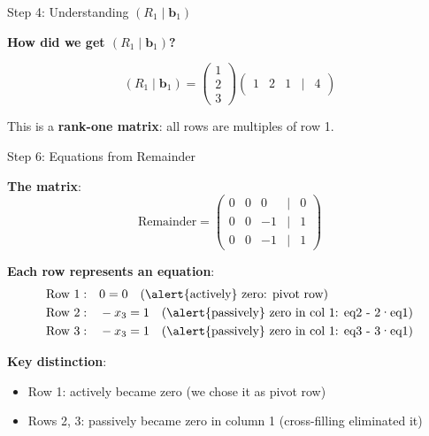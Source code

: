 \documentclass[10pt]{beamer}
\theoremstyle{definition}
\newcommand{\x}[1]{\alert{\textbf{#1}}}
\begin{document}
\begin{frame}{Step 4: Understanding $(R_1 \mid \mathbf{b}_1)$}

\x{How did we get $(R_1 \mid \mathbf{b}_1)$?}

$$(R_1 \mid \mathbf{b}_1) = \begin{pmatrix} 1 \\ 2 \\ 3 \end{pmatrix} \begin{pmatrix} 1 & 2 & 1 & | & 4 \end{pmatrix}$$

\vspace{1em}

This is a \x{rank-one matrix}: all rows are multiples of row 1.

\end{frame}

\begin{frame}{Step 6: Equations from Remainder}

\x{The matrix}:
$$\text{Remainder} = \begin{pmatrix}
0 & 0 & 0 & | & 0 \\
0 & 0 & -1 & | & 1 \\
0 & 0 & -1 & | & 1
\end{pmatrix}$$

\vspace{0.5em}

\x{Each row represents an equation}:
\begin{align*}
\text{Row 1}: &\quad 0 = 0 \quad \text{(\alert{actively} zero: pivot row)} \\
\text{Row 2}: &\quad -x_3 = 1 \quad \text{(\alert{passively} zero in col 1: eq2 - 2·eq1)} \\
\text{Row 3}: &\quad -x_3 = 1 \quad \text{(\alert{passively} zero in col 1: eq3 - 3·eq1)}
\end{align*}

\x{Key distinction}:
\begin{itemize}
\item Row 1: \alert{actively} became zero (we chose it as pivot row)
\item Rows 2, 3: \alert{passively} became zero in column 1 (cross-filling eliminated it)
\end{itemize}

\end{frame}
\end{document}
